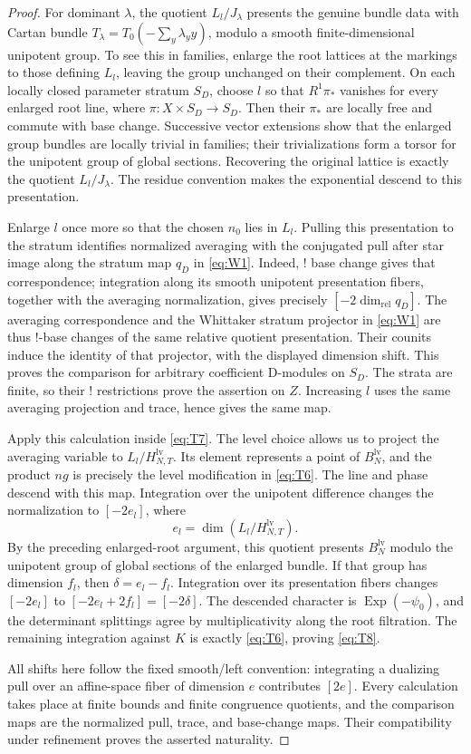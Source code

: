 \begin{proof}
For dominant $\lambda$, the quotient $L_l/J_\lambda$ presents the
genuine bundle data with Cartan bundle
$T_\lambda=T_0(-\sum_y\lambda_y y)$, modulo a smooth finite-dimensional
unipotent group.  To see this in families, enlarge the root lattices
at the markings to those defining $L_l$, leaving the group unchanged
on their complement.  On each locally closed parameter stratum $S_D$,
choose $l$ so that
$R^1\pi_*$ vanishes for every enlarged root line, where
$\pi:X\times S_D\to S_D$.  Then their $\pi_*$ are locally free and
commute with base change.  Successive vector extensions show that
the enlarged group bundles are locally trivial in families; their trivializations form a torsor for the
unipotent group of global sections.  Recovering the original lattice
is exactly the quotient $L_l/J_\lambda$.  The residue convention
makes the exponential descend to this presentation.

Enlarge $l$ once more so that the chosen $n_0$ lies in $L_l$.
Pulling this presentation to the stratum identifies normalized
averaging with the conjugated pull after star image along the
stratum map $q_D$ in \eqref{eq:W1}.  Indeed, $!$ base change gives
that correspondence; integration along its smooth unipotent
presentation fibers, together with the averaging normalization,
gives precisely $[-2\dim_{\mathrm{rel}}q_D]$.  The averaging correspondence
and the Whittaker stratum projector
in \eqref{eq:W1} are thus $!$-base changes of the same relative quotient
presentation.  Their counits induce the identity of that projector,
with the displayed dimension shift.  This proves the comparison for
arbitrary coefficient D-modules on $S_D$.  The strata are finite, so
their $!$ restrictions
prove the assertion on $Z$.  Increasing $l$ uses the same averaging
projection and trace, hence gives the same map.

Apply this calculation inside \eqref{eq:T7}.  The level choice allows
us to project the averaging variable to
$L_l/H_{N,T}^{\mathrm{lv}}$.  Its element represents a point of
$B_N^{\mathrm{lv}}$, and the product $ng$ is precisely the level
modification in \eqref{eq:T6}.  The line and phase descend with this
map.  Integration over the unipotent difference changes the
normalization to $[-2e_l]$, where
\[
 e_l=\dim(L_l/H_{N,T}^{\mathrm{lv}}).
\]
By the preceding enlarged-root argument, this quotient presents
$B_N^{\mathrm{lv}}$ modulo the unipotent group of global sections of
the enlarged bundle.  If that group has dimension $f_l$, then
$\delta=e_l-f_l$.  Integration over its presentation fibers changes
$[-2e_l]$ to $[-2e_l+2f_l]=[-2\delta]$.
The descended character is $\operatorname{Exp}(-\psi_0)$, and the
determinant splittings agree by multiplicativity along the root
filtration.  The remaining integration against $K$ is exactly
\eqref{eq:T6}, proving \eqref{eq:T8}.

All shifts here follow the fixed smooth/left convention: integrating
a dualizing pull over an affine-space fiber of dimension $e$
contributes $[2e]$.  Every calculation takes place at finite bounds
and finite congruence quotients, and the comparison maps are the
normalized pull, trace, and base-change maps.  Their compatibility
under refinement proves the asserted naturality.
\end{proof}
